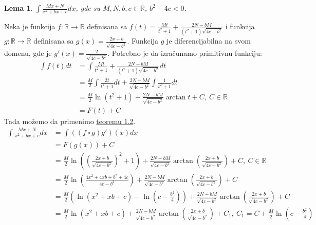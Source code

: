 \documentclass{article}
\newtheorem{lema}{Lema}[section]
\begin{document}
\begin{lemabox}
    \begin{lema}
        \label{lema_1.1.3}
        $\int \frac{Mx+N}{x^2+bx+c}dx$, gde su $M,N,b,c\in\mathbb{R}$, $b^2 - 4c < 0$.
    \end{lema}
    Neka je funkcija $f:\mathbb{R}\longrightarrow\mathbb{R}$ definisana sa
    $f(t)=\frac{Mt}{t^2+1}+\frac{2N-bM}{(t^2+1)\sqrt{4c-b^2}}$ i funkcija $g:\mathbb{R}\longrightarrow\mathbb{R}$
    definisana sa $g(x)=\frac{2x+b}{\sqrt{4c-b^2}}$. Funkcija $g$ je diferencijabilna na svom domenu, gde je $g'(x)=\frac{2}{\sqrt{4c-b^2}}$.
    Potrebno je da izračunamo primitivnu funkciju:
    \begin{align*}
        \int f(t)dt & =\int \frac{Mt}{t^2+1}+\frac{2N-bM}{(t^2+1)\sqrt{4c-b^2}}dt                          \\
                    & =\frac{M}{2}\int \frac{2t}{t^2+1}dt+\frac{2N-bM}{\sqrt{4c-b^2}}\int\frac{1}{t^2+1}dt \\
                    & =\frac{M}{2}\ln(t^2+1)+\frac{2N-bM}{\sqrt{4c-b^2}}\arctan{t}+C,\ C\in\mathbb{R}      \\
                    & =F(t)+C
    \end{align*}
    Tada možemo da primenimo \hyperref[teorema_1.2]{teoremu 1.2}.
    \begin{align*}
        \int \frac{Mx+N}{x^2+bx+c}dx & = \int ((f\circ g) g')(x)dx                                                                                                               \\
                                     & = F(g(x)) + C                                                                                                                             \\
                                     & = \frac{M}{2}\ln((\frac{2x+b}{\sqrt{4c-b^2}})^2+1)+\frac{2N-bM}{\sqrt{4c-b^2}}\arctan({\frac{2x+b}{\sqrt{4c-b^2}}})+ C,\ C\in\mathbb{R}   \\
                                     & = \frac{M}{2}\ln(\frac{4x^2+4xb+b^2+4c}{4c-b^2})+\frac{2N-bM}{\sqrt{4c-b^2}}\arctan({\frac{2x+b}{\sqrt{4c-b^2}}})+ C                      \\
                                     & = \frac{M}{2}(\ln(x^2+xb+c)-\ln(c-\frac{b^2}{4}))+\frac{2N-bM}{\sqrt{4c-b^2}}\arctan({\frac{2x+b}{\sqrt{4c-b^2}}})+ C                     \\
                                     & = \frac{M}{2}\ln(x^2+xb+c)+\frac{2N-bM}{\sqrt{4c-b^2}}\arctan({\frac{2x+b}{\sqrt{4c-b^2}}})+ C_1,\ C_1=C+ \frac{M}{2}\ln(c-\frac{b^2}{4}) \\
    \end{align*}
\end{lemabox}
\end{document}
